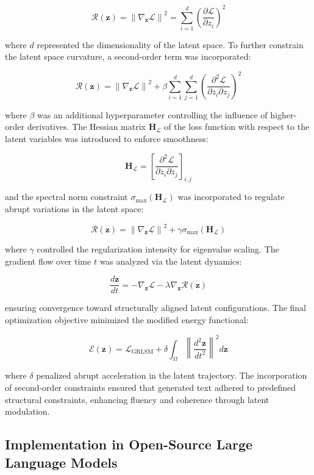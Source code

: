 \documentclass{article}
\begin{document}
\[
\mathcal{R}(\mathbf{z}) = \left\| \nabla_{\mathbf{z}} \mathcal{L} \right\|^2 = \sum_{i=1}^{d} \left( \frac{\partial \mathcal{L}}{\partial z_i} \right)^2
\]

where \( d \) represented the dimensionality of the latent space. To further constrain the latent space curvature, a second-order term was incorporated:

\[
\mathcal{R}(\mathbf{z}) = \left\| \nabla_{\mathbf{z}} \mathcal{L} \right\|^2 + \beta \sum_{i=1}^{d} \sum_{j=1}^{d} \left( \frac{\partial^2 \mathcal{L}}{\partial z_i \partial z_j} \right)^2
\]

where \( \beta \) was an additional hyperparameter controlling the influence of higher-order derivatives. The Hessian matrix \( \mathbf{H}_{\mathcal{L}} \) of the loss function with respect to the latent variables was introduced to enforce smoothness:

\[
\mathbf{H}_{\mathcal{L}} = \left[ \frac{\partial^2 \mathcal{L}}{\partial z_i \partial z_j} \right]_{i,j}
\]

and the spectral norm constraint \( \sigma_{\max}(\mathbf{H}_{\mathcal{L}}) \) was incorporated to regulate abrupt variations in the latent space:

\[
\mathcal{R}(\mathbf{z}) = \left\| \nabla_{\mathbf{z}} \mathcal{L} \right\|^2 + \gamma \sigma_{\max} (\mathbf{H}_{\mathcal{L}})
\]

where \( \gamma \) controlled the regularization intensity for eigenvalue scaling. The gradient flow over time \( t \) was analyzed via the latent dynamics:

\[
\frac{d\mathbf{z}}{dt} = - \nabla_{\mathbf{z}} \mathcal{L} - \lambda \nabla_{\mathbf{z}} \mathcal{R}(\mathbf{z})
\]

ensuring convergence toward structurally aligned latent configurations. The final optimization objective minimized the modified energy functional:

\[
\mathcal{E}(\mathbf{z}) = \mathcal{L}_{\text{GRLSM}} + \delta \int_{\Omega} \left\| \frac{d^2\mathbf{z}}{dt^2} \right\|^2 d\mathbf{z}
\]

where \( \delta \) penalized abrupt acceleration in the latent trajectory. The incorporation of second-order constraints ensured that generated text adhered to predefined structural constraints, enhancing fluency and coherence through latent modulation.


\subsection{Implementation in Open-Source Large Language Models}
\end{document}
